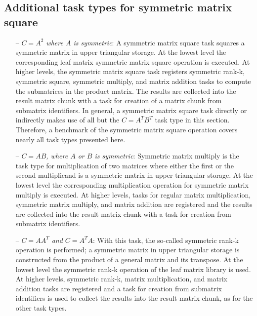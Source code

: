 \documentclass{elsarticle}
\begin{document}
\subsection{Additional task types for symmetric matrix square}\label{subsec:sysq-task-types}
\begin{itemize}
\item[--]\emph{$C = A^2$ where $A$ is symmetric}:
A symmetric matrix square task squares a symmetric matrix in upper
triangular storage. At the lowest level the corresponding leaf matrix
symmetric matrix square operation is executed. At higher levels, the
symmetric matrix square task registers symmetric rank-k, symmetric
square, symmetric multiply, and matrix addition tasks to compute the
submatrices in the product matrix.  The results are collected into the
result matrix chunk with a task for creation of a matrix chunk from
submatrix identifiers. In general, a symmetric matrix square task
directly or indirectly makes use of all but the $C = A^TB^T$ task type
in this section.
Therefore, a benchmark of the symmetric matrix square operation covers
nearly all task types presented here.


\item[--]\emph{$C = AB$, where $A$ or $B$ is symmetric}:
Symmetric matrix multiply is the task type for multiplication of two
matrices where either the first or the second multiplicand is a
symmetric matrix in upper triangular storage.  At the lowest level the
corresponding multiplication operation for symmetric matrix multiply
is executed. At higher levels, tasks for regular matrix
multiplication, symmetric matrix multiply, and matrix addition are
registered and the results are collected into the result matrix chunk
with a task for creation from submatrix identifiers.

\item[--]\emph{$C = AA^T$ and $C = A^TA$}:
With this task, the so-called symmetric rank-k operation is performed;
a symmetric matrix in upper triangular storage is constructed from the
product of a general matrix and its transpose.  At the lowest level
the symmetric rank-k operation of the leaf matrix library is used. At
higher levels, symmetric rank-k, matrix multiplication, and matrix
addition tasks are registered and
a task for creation from submatrix identifiers is used
to collect the results into the result matrix
chunk, as for the other task types.

\end{itemize}

 
\end{document}
